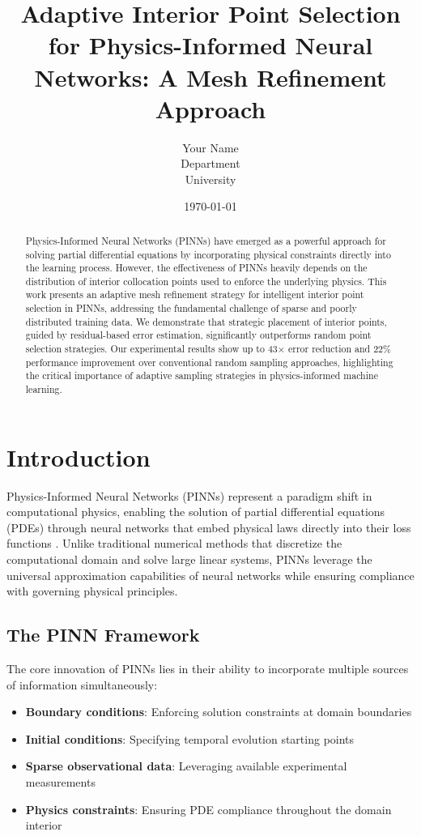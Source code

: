 \documentclass[11pt,a4paper]{article}
\title{Adaptive Interior Point Selection for Physics-Informed Neural Networks: A Mesh Refinement Approach}
\author{%
  Your Name\\
  Department\\
  University\\
}
\date{\today}
\begin{document}
\maketitle

\begin{abstract}
Physics-Informed Neural Networks (PINNs) have emerged as a powerful approach for solving partial differential equations by incorporating physical constraints directly into the learning process. However, the effectiveness of PINNs heavily depends on the distribution of interior collocation points used to enforce the underlying physics. This work presents an adaptive mesh refinement strategy for intelligent interior point selection in PINNs, addressing the fundamental challenge of sparse and poorly distributed training data. We demonstrate that strategic placement of interior points, guided by residual-based error estimation, significantly outperforms random point selection strategies. Our experimental results show up to 43× error reduction and 22\% performance improvement over conventional random sampling approaches, highlighting the critical importance of adaptive sampling strategies in physics-informed machine learning.
\end{abstract}

\section{Introduction}

Physics-Informed Neural Networks (PINNs) represent a paradigm shift in computational physics, enabling the solution of partial differential equations (PDEs) through neural networks that embed physical laws directly into their loss functions \cite{raissi2019physics}. Unlike traditional numerical methods that discretize the computational domain and solve large linear systems, PINNs leverage the universal approximation capabilities of neural networks while ensuring compliance with governing physical principles.

\subsection{The PINN Framework}

The core innovation of PINNs lies in their ability to incorporate multiple sources of information simultaneously:

\begin{itemize}
    \item \textbf{Boundary conditions}: Enforcing solution constraints at domain boundaries
    \item \textbf{Initial conditions}: Specifying temporal evolution starting points
    \item \textbf{Sparse observational data}: Leveraging available experimental measurements
    \item \textbf{Physics constraints}: Ensuring PDE compliance throughout the domain interior
\end{itemize}
\end{document}
